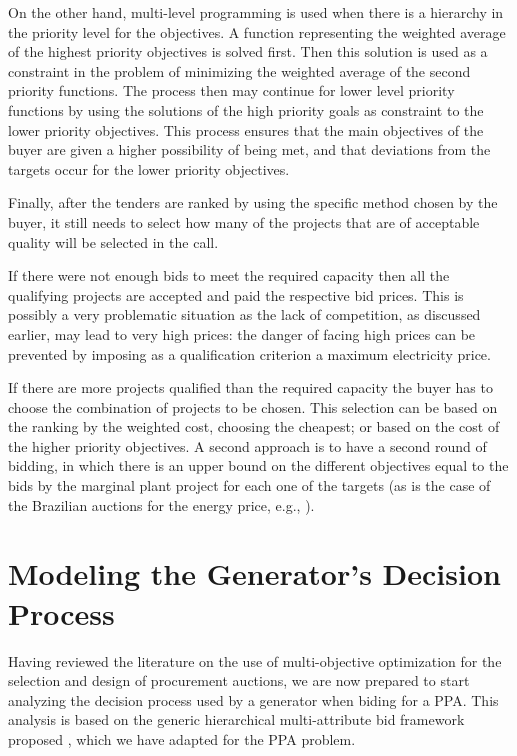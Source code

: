 \documentclass[informs]{informs3}
\begin{document}
On the other hand, multi-level programming is used when there is a hierarchy in the priority level for the objectives. A function representing the weighted average of the highest priority objectives is solved first. Then this solution is used as a constraint in the problem of minimizing the weighted average of the second priority functions. The process then may continue for lower level priority functions by using the solutions of the high priority goals as constraint to the lower priority objectives. This process ensures that the main objectives of the buyer are given a higher possibility of being met, and that deviations from the targets occur for the lower priority objectives.      

Finally, after the tenders are ranked by using the specific method chosen by the buyer, it still needs to select how many of the projects that are of acceptable quality will be selected in the call. 

If there were not enough bids to meet the required capacity then all the qualifying projects are accepted and paid the respective bid prices. This is possibly a very problematic situation as the lack of competition, as discussed earlier, may lead to very high prices: the danger of facing high prices can be prevented by imposing as a qualification criterion a maximum electricity price.

If there are more projects qualified than the required capacity the buyer has to choose the combination of projects to be chosen. This selection can be based on the ranking by the weighted cost, choosing the cheapest; or based on the cost of the higher priority objectives. A second approach is to have a second round of bidding, in which there is an upper bound on the different objectives equal to the bids by the marginal plant project for each one of the targets (as is the case of the Brazilian auctions for the energy price, e.g., \citealp{Rego_Parente_2013}).


\section{Modeling the Generator’s Decision Process } \label{Section_Generator}

Having reviewed the literature on the use of multi-objective optimization for the selection and design of procurement auctions, we are now prepared to start analyzing the decision process used by a generator when biding for a PPA. This analysis is based on the generic hierarchical multi-attribute bid framework proposed \cite{Chua_Li_2000}, which we have adapted for the PPA problem. 
\end{document}
